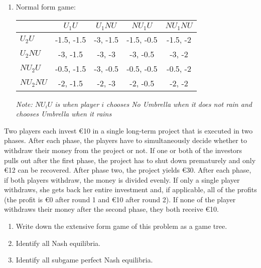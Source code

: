 \documentclass[../main.tex]{subfiles}
\begin{document}
\begin{solution}
\begin{enumerate}
\begin{center}
\end{center}

\item Normal form game:
\begin{center}
	    \begin{tabular}{|l|c|c|c|c|}
	    \hline
	    			      & $U_1 U$ 		& $U_1 NU$ 		& $NU_1 U$ 		& $NU_1 NU$ 	\\
	    \hline
	    $U_2 U$ 	  & -1.5, -1.5 	& -3, -1.5	  & -1.5, -0.5 	& -1.5, -2		\\
	    \hline
	    $U_2 NU$  	& -3, -1.5 		& -3, -3 		  & -3, -0.5 		& -3, -2			\\
	    \hline
	    $NU_2 U$  	& -0.5, -1.5 	& -3, -0.5 	  & -0.5, -0.5 	& -0.5, -2    \\
	    \hline
	    $NU_2 NU$  	& -2, -1.5	 	& -2, -3 		 & -2, -0.5 		& -2, -2		  \\
	    \hline
	    \end{tabular}
    \end{center}
    \emph{Note: $NU_i U $ is when player $i$ chooses No Umbrella when it does not rain and chooses Umbrella when it rains}

\end{enumerate}
\end{solution}

\begin{question}
Two players each invest \euro10 in a single long-term project that is executed in two phases. After each phase, the players have to simultaneously decide whether to withdraw their money from the project or not. If one or both of the investors pulls out after the first phase, the project has to shut down prematurely and only \euro12 can be recovered. After phase two, the project yields \euro30. After each phase, if both players withdraw, the money is divided evenly. If only a single player withdraws, she gets back her entire investment and, if applicable, all of the profits (the profit is \euro0 after round 1 and \euro10 after round 2). If none of the player withdraws their money after the second phase, they both receive \euro10.
\begin{enumerate}
\item Write down the extensive form game of this problem as a game tree.
\item Identify all Nash equilibria.
\item Identify all subgame perfect Nash equilibria.
\end{enumerate}
\end{question}
\end{document}
